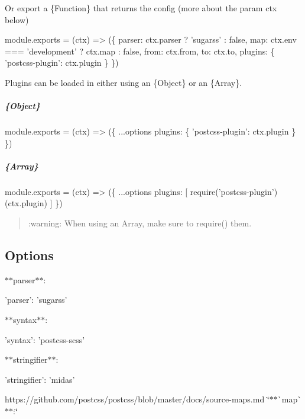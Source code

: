 Or export a {\ttfamily \{Function\}} that returns the config (more about the param {\ttfamily ctx} below)


\begin{DoxyCode}
module.exports = (ctx) => (\{
  parser: ctx.parser ? 'sugarss' : false,
  map: ctx.env === 'development' ? ctx.map : false,
  from: ctx.from,
  to: ctx.to,
  plugins: \{
    'postcss-plugin': ctx.plugin
  \}
\})
\end{DoxyCode}


Plugins can be loaded in either using an {\ttfamily \{Object\}} or an {\ttfamily \{Array\}}.

\subparagraph*{{\ttfamily \{Object\}}}


\begin{DoxyCode}
module.exports = (ctx) => (\{
  ...options
  plugins: \{
    'postcss-plugin': ctx.plugin
  \}
\})
\end{DoxyCode}


\subparagraph*{{\ttfamily \{Array\}}}


\begin{DoxyCode}
module.exports = (ctx) => (\{
  ...options
  plugins: [
    require('postcss-plugin')(ctx.plugin)
  ]
\})
\end{DoxyCode}
 \begin{quote}
\+:warning\+: When using an Array, make sure to {\ttfamily require()} them. \end{quote}


\subsection*{Options}

$\ast$$\ast${\ttfamily parser}$\ast$$\ast$\+:


\begin{DoxyCode}
'parser': 'sugarss'
\end{DoxyCode}


$\ast$$\ast${\ttfamily syntax}$\ast$$\ast$\+:


\begin{DoxyCode}
'syntax': 'postcss-scss'
\end{DoxyCode}
 $\ast$$\ast${\ttfamily stringifier}$\ast$$\ast$\+:


\begin{DoxyCode}
'stringifier': 'midas'
\end{DoxyCode}


https\+://github.com/postcss/postcss/blob/master/docs/source-\/maps.\+md \char`\"{}$\ast$$\ast$\`{}map\`{}$\ast$$\ast$\+:\char`\"{}


